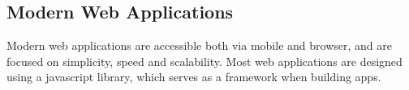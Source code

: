 \subsection{Modern Web Applications}

Modern web applications are accessible both via mobile and browser,
and are focused on simplicity, speed and scalability.
Most web applications are designed using a javascript library, which
serves as a framework when building apps.
